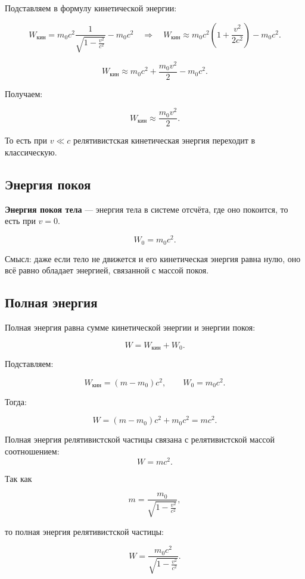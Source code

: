 \documentclass[a4paper,12pt]{article}
\begin{document}
Подставляем в формулу кинетической энергии:

\[
W_{\text{кин}}
=
m_0c^2
\frac{1}{\sqrt{1-\frac{v^2}{c^2}}}
-
m_0c^2
\quad \Rightarrow \quad
W_{\text{кин}}
\approx
m_0c^2
\left(
1+\frac{v^2}{2c^2}
\right)
-
m_0c^2.
\]

\[
W_{\text{кин}}
\approx
m_0c^2
+
\frac{m_0v^2}{2}
-
m_0c^2.
\]

Получаем:

\[
W_{\text{кин}}
\approx
\frac{m_0v^2}{2}.
\]

То есть при $v \ll c$ релятивистская кинетическая энергия переходит в классическую.

\subsection*{Энергия покоя}

\begin{definitionbox}
\textbf{Энергия покоя тела} — энергия тела в системе отсчёта, где оно покоится, то есть при $v=0$.

\[
W_0=m_0c^2.
\]
\end{definitionbox} 

Смысл: даже если тело не движется и его кинетическая энергия равна нулю, оно всё равно обладает энергией, связанной с массой покоя.

\subsection*{Полная энергия}

Полная энергия равна сумме кинетической энергии и энергии покоя:

\[
W=W_{\text{кин}}+W_0.
\]

Подставляем:

\[
W_{\text{кин}}=(m-m_0)c^2,
\qquad
W_0=m_0c^2.
\]

Тогда:

\[
W
=
(m-m_0)c^2
+
m_0c^2
=
mc^2.
\]

\begin{theorembox}
Полная энергия релятивистской частицы связана с релятивистской массой соотношением:
\[
W=mc^2.
\]
\end{theorembox}

Так как

\[
m=
\frac{m_0}{\sqrt{1-\frac{v^2}{c^2}}},
\]

то полная энергия релятивистской частицы:

\[
W
=
\frac{m_0c^2}{\sqrt{1-\frac{v^2}{c^2}}}.
\]
\end{document}
